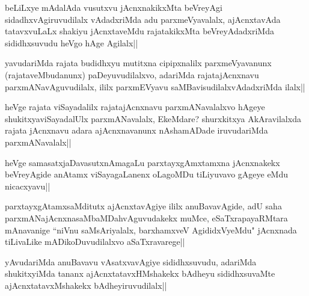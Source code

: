 \begin{artha}
beLiLxye mAdalAda vusutxvu jAcnxnakikxMta beVreyAgi sidadhxvAgiruvudilalx vAdadxriMda adu parxmeVyavalalx, ajAcnxtavAda tatavxvuLaLx shakiyu jAcnxtaveMdu rajatakikxMta beVreyAdadxriMda sididhxsuvudu heVgo hAge Agilalx||
\end{artha}

\begin{artha}
yavudariMda rajata budidhxyu mutitxna cipipxnalilx parxmeVyavanunx (rajataveMbudanunx) paDeyuvudilalxvo, adariMda rajatajAcnxnavu parxmANavAguvudilalx, ililx parxmEVyavu saMBavisudilalxvAdadxriMda ilalx||
\end{artha}

\begin{artha}
heVge rajata viSayadalilx rajatajAcnxnavu parxmANavalalxvo hAgeye shukitxyaviSayadalUlx parxmANavalalx, EkeMdare? shurxkitxya AkAravilalxda rajata jAcnxnavu adara ajAcnxnavanunx nAshamADade iruvudariMda parxmANavalalx||
\end{artha}


\begin{artha}
heVge samasatxjaDavasutxnAmagaLu parxtayxgAmxtamxna jAcnxnakekx beVreyAgide anAtamx viSayagaLanenx oLagoMDu tiLiyuvavo gAgeye eMdu nicacxyavu||
\end{artha}

\begin{artha}
parxtayxgAtamxsaMditutx ajAcnxtavAgiye ililx anuBavavAgide, adU saha parxmANajAcnxnasaMbaMDahvAguvudakekx muMce, eSaTxrapayaRMtara mAnavanige ``niVnu saMsAriyalalx, barxhamxveV AgididxVyeMdu" jAcnxnada tiLivaLike mADikoDuvudilalxvo aSaTxravarege||
\end{artha}


\begin{artha}
yAvudariMda anuBavavu vAsatxvavAgiye sididhxsuvudu, adariMda shukitxyiMda tananx ajAcnxtatavxHMshakekx bAdheyu sididhxsuvaMte ajAcnxtatavxMshakekx bAdheyiruvudilalx||
\end{artha}

